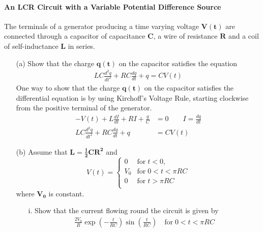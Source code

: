 \documentclass[]{article}
\begin{document}
{		\paragraph{An LCR Circuit with a Variable Potential Difference Source} The terminals of a generator producing a time varying voltage $\bm{V(t)}$ are connected through a capacitor of capacitance $\bm{C}$, a wire of resistance $\bm{R}$ and a coil of self-inductance $\bm{L}$ in series.
			\begin{enumerate}
				\item[(a)] Show that the charge $\bm{q(t)}$ on the capacitor satisfies the equation
					\begin{equation*}
						\begin{split}
							LC \frac{d^2 q}{dt^2} + RC \frac{dq}{dt} + q = CV(t)
						\end{split}
					\end{equation*}
					One way to show that the charge $\bm{q(t)}$ on the capacitor satisfies the differential equation is by using Kirchoff's Voltage Rule, starting clockwise from the positive terminal of the generator.
						\begin{equation*}
							\begin{split}
								-V(t) + L \frac{dI}{dt} + RI + \frac{q}{C} &= 0 \quad \quad I = \frac{dq}{dt} \\
								LC \frac{d^2 q}{dt^2} + RC\frac{dq}{dt} + q &= CV(t)
							\end{split}
						\end{equation*} 
				\item[(b)] Assume that $\bm{L = \frac{1}{2} CR^2}$ and
					\begin{equation*}
						V(t) =
						\begin{cases}
							0   & \text{for} \; t < 0, \\
							V_0 & \text{for} \; 0 < t < \pi RC \\
							0   & \text{for} \; t > \pi RC \\
						\end{cases}
					\end{equation*}
					where $\bm{V_0}$ is constant.
					\begin{enumerate}
						\item[i.] Show that the current flowing round the circuit is given by
							\begin{equation*}
								\begin{split}
									\frac{2V_0}{R} \exp( -\frac{t}{RC} ) \sin( \frac{t}{RC} ) \quad \text{for} \; 0 < t < \pi RC

\end{split}
\end{equation*}
\end{enumerate}
\end{enumerate}}
\end{document}
